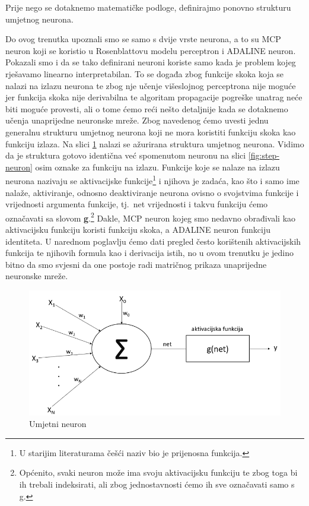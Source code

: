 \documentclass[times, utf8, zavrsni]{fer}
\begin{document}
Prije nego se dotaknemo matematičke podloge, definirajmo ponovno strukturu umjetnog neurona.

Do ovog trenutka upoznali smo se samo s dvije vrste neurona, a to su MCP neuron koji se koristio u Rosenblattovu modelu perceptron i ADALINE neuron. Pokazali smo i da se tako definirani neuroni koriste samo kada je problem kojeg rješavamo linearno interpretabilan. To se događa zbog funkcije skoka koja se nalazi na izlazu neurona te zbog nje učenje višeslojnog perceptrona nije moguće jer funkcija skoka nije derivabilna te algoritam propagacije pogreške unatrag neće biti moguće provesti, ali o tome ćemo reći nešto detaljnije kada se dotaknemo učenja unaprijedne neuronske mreže. Zbog navedenog ćemo uvesti jednu generalnu strukturu umjetnog neurona koji ne mora koristiti funkciju skoka kao funkciju izlaza. Na slici \ref{fig:ai-neuron} nalazi se ažurirana struktura umjetnog neurona. Vidimo da je struktura gotovo identična već spomenutom neuronu na slici \ref{fig:step-neuron} osim oznake za funkciju na izlazu. Funkcije koje se nalaze na izlazu neurona nazivaju se aktivacijske funkcije\footnote{U starijim literaturama češći naziv bio je prijenosna funkcija.} i njihova je zadaća, kao što i samo ime nalaže, aktiviranje, odnosno deaktiviranje neurona ovisno o svojstvima funkcije i vrijednosti argumenta funkcije, tj.\ net vrijednosti i takvu funkciju ćemo označavati sa slovom \textbf{g}.\footnote{Općenito, svaki neuron može ima svoju aktivacijsku funkciju te zbog toga bi ih trebali indeksirati, ali zbog jednostavnosti ćemo ih sve označavati samo s g.} Dakle, MCP neuron kojeg smo nedavno obrađivali kao aktivacijsku funkciju koristi funkciju skoka, a ADALINE neuron funkciju identiteta. U narednom poglavlju ćemo dati pregled često korištenih aktivacijskih funkcija te njihovih formula kao i derivacija istih, no u ovom trenutku je jedino bitno da smo svjesni da one postoje radi matričnog prikaza unaprijedne neuronske mreže.

\begin{figure}[H]
    \centering
    \includegraphics[scale=0.6]{img/ai-neuron.png}
    \caption[Caption for LOF]{Umjetni neuron\footnotemark}
    \label{fig:ai-neuron}
\end{figure}
\end{document}
